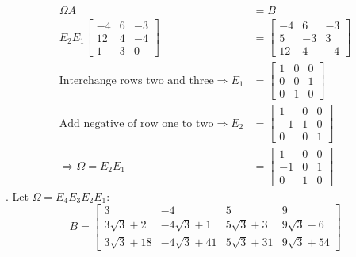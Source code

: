 \documentclass[11pt]{homework}
\begin{document}
\begin{align*}
\Omega A &= B \\
E_2 E_1
  \begin{bmatrix}
  -4 & 6 & -3 \\
  12 & 4 & -4 \\
  1 & 3 & 0 
  \end{bmatrix}
  &=
  \begin{bmatrix}
  -4 & 6 & -3 \\
  5 & -3 & 3  \\
  12 & 4 & -4
  \end{bmatrix} \\
\text{Interchange rows two and three}
\Rightarrow 
E_1 &= 
  \begin{bmatrix}
  1 & 0 & 0  \\
  0 & 0 & 1  \\
  0 & 1 & 0
  \end{bmatrix} \\
\text{Add negative of row one to two}
\Rightarrow 
E_2 &= 
  \begin{bmatrix}
  1 & 0 & 0  \\
  -1 & 1 & 0  \\
  0 & 0 & 1
  \end{bmatrix} \\
\Rightarrow 
\Omega = E_2 E_1 &=
  \begin{bmatrix}
  1 & 0 & 0  \\
  -1 & 0 & 1  \\
  0 & 1 & 0
  \end{bmatrix}
\end{align*}
. Let $\Omega = E_4 E_3 E_2 E_1$:  
\begin{equation*}
B = 
  \begin{bmatrix}
  3 & -4 & 5 & 9 \\
  3\sqrt{3}+2 & -4 \sqrt{3} +1 & 5 \sqrt{3} +3 & 9 \sqrt{3} -6 \\
  3\sqrt{3}+18 & -4 \sqrt{3} +41 & 5 \sqrt{3} +31 & 9 \sqrt{3} +54
  \end{bmatrix}
\end{equation*}
\end{document}
